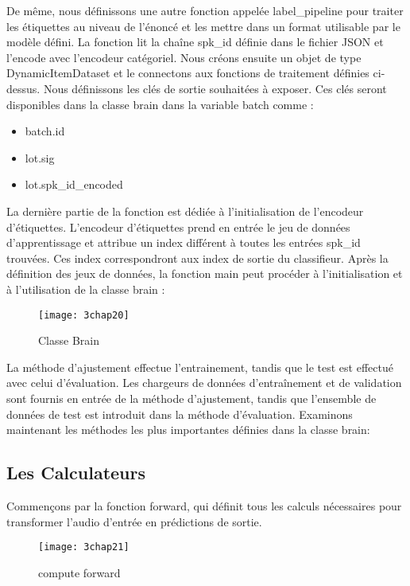 De même, nous définissons une autre fonction appelée label\_pipeline pour traiter les étiquettes au niveau de l'énoncé et les mettre dans un format utilisable par le modèle défini. La fonction lit la chaîne spk\_id définie dans le fichier JSON et l'encode avec l'encodeur catégoriel.
Nous créons ensuite un objet de type DynamicItemDataset et le connectons aux fonctions de traitement définies ci-dessus. Nous définissons les clés de sortie souhaitées à exposer. Ces clés seront disponibles dans la classe brain dans la variable batch comme :
\begin{itemize}
    \item batch.id
    \item lot.sig
    \item lot.spk\_id\_encoded
\end{itemize}

La dernière partie de la fonction est dédiée à l'initialisation de l'encodeur d'étiquettes. L'encodeur d'étiquettes prend en entrée le jeu de données d'apprentissage et attribue un index différent à toutes les entrées spk\_id trouvées. Ces index correspondront aux index de sortie du classifieur.
Après la définition des jeux de données, la fonction main peut procéder à l'initialisation et à l'utilisation de la classe brain :

\begin{figure}[h]
	\centering
	\texttt{[image: 3chap20]}
	\caption{Classe Brain}
	\label{fig:3chap20}
\end{figure}

La méthode d'ajustement effectue l’entrainement, tandis que le test est effectué avec celui d'évaluation. Les chargeurs de données d'entraînement et de validation sont fournis en entrée de la méthode d'ajustement, tandis que l'ensemble de données de test est introduit dans la méthode d'évaluation.
Examinons maintenant les méthodes les plus importantes définies dans la classe brain:

\subsection*{Les Calculateurs}
Commençons par la fonction forward, qui définit tous les calculs nécessaires pour transformer l'audio d'entrée en prédictions de sortie.

\begin{figure}[h]
	\centering
	\texttt{[image: 3chap21]}
	\caption{compute forward}
	\label{fig:3chap21}
\end{figure}

